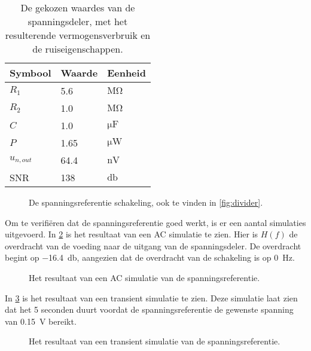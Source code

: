\begin{table}[!htbp]
    \centering
    \begin{tabular}{l|l|l}
        Symbool & Waarde & Eenheid \\
        \hline
        $R_1$       & 5.6  & $\si{\mega\ohm}$   \\
        $R_2$       & 1.0  & $\si{\mega\ohm}$   \\
        $C$         & 1.0  & $\si{\micro\farad}$\\
        $P$         & 1.65 & $\si{\micro\watt}$ \\
        $u_{n,out}$ & 64.4 & $\si{\nano\volt}$  \\
        SNR         & 138  & $\si{\decibel}$
    \end{tabular}
    \caption{De gekozen waardes van de spanningsdeler, met het resulterende vermogensverbruik en de ruiseigenschappen.}
    \label{tab:divider}
\end{table}

\begin{figure}[!htbp]
    \centering
    \def\svgwidth{7cm}
    
    \caption{De spanningsreferentie schakeling, ook te vinden in \cref{fig:divider}.}
    \label{fig:dividerForContext}
\end{figure}

Om te verifiëren dat de spanningsreferentie goed werkt, is er een aantal simulaties uitgevoerd.
In \cref{fig:referenceSimFreq} is het resultaat van een AC simulatie te zien. Hier is $H(f)$ de overdracht van de voeding naar de uitgang van de spanningsdeler. De overdracht begint op \qty{-16.4}{\decibel}, aangezien dat de overdracht van de schakeling is op \qty{0}{\hertz}.

\begin{figure}[!htbp]
    \centering
    \pgfplotsset{width=0.7\textwidth}
    
    \caption{Het resultaat van een AC simulatie van de spanningsreferentie.}
    \label{fig:referenceSimFreq}
\end{figure}

In \cref{fig:referenceSimTrans} is het resultaat van een transient simulatie te zien. Deze simulatie laat zien dat het 5 seconden duurt voordat de spanningsreferentie de gewenste spanning van \qty{0.15}{\volt} bereikt.
\begin{figure}[!htbp]
    \centering
    \pgfplotsset{width=0.7\textwidth}
    
    \caption{Het resultaat van een transient simulatie van de spanningsreferentie.}
    \label{fig:referenceSimTrans}
\end{figure}

